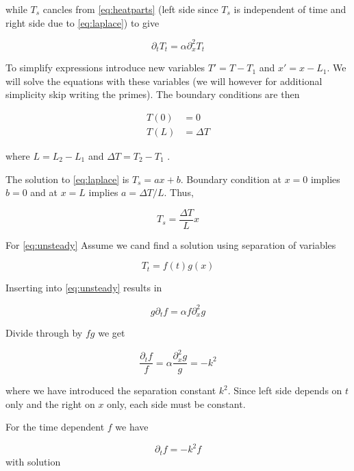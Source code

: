 \documentclass{article}
\begin{document}
while $T_s$ cancles from \ref{eq:heatparts} (left side since $T_s$ is independent of time and right side due to \ref{eq:laplace}) to give 

\begin{equation}
\label{eq:unsteady}
\partial_t T_t = \alpha \partial_x^2 T_t
\end{equation}

To simplify expressions introduce new variables $T' = T-T_1$ and $x' = x-L_1$. We will solve the equations with these variables (we will however for additional simplicity skip writing the primes). The boundary conditions are then 

\begin{align}
T(0) &= 0 \\
T(L) &= \Delta T
\end{align}

where $L = L_2-L_1$ and $\Delta T = T_2-T_1$ .

The solution to \ref{eq:laplace} is $T_s = ax + b$. Boundary condition at $x = 0$ implies $b=0$ and at $x=L$ implies $ a= \Delta T/L$. Thus,

\begin{equation}
T_s = \frac{\Delta T}{L} x
\end{equation}

For \ref{eq:unsteady}  Assume we cand find a solution using separation of variables

\begin{equation}
T_t = f(t)g(x)
\end{equation}

Inserting into \ref{eq:unsteady} results in

\begin{equation}
g\partial_t f = \alpha f \partial_x^2 g
\end{equation}

Divide through by $fg$ we get

\begin{equation}
\frac{\partial_t f}{f} = \alpha \frac{\partial_x^2 g}{g} = -k^2
\end{equation}

where we have introduced the  separation constant $k^2$. Since left side depends on $t$ only and the right on $x$ only, each side must be constant.

For the time dependent $f$ we have

\begin{equation}
\partial_t f= -k^2 f
\end{equation}
with solution
\end{document}
